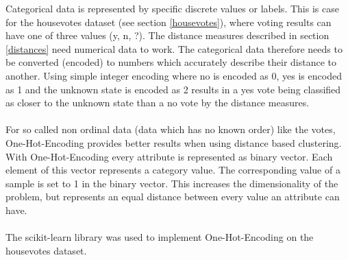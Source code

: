 Categorical data is represented by specific discrete values or labels. This is case for the housevotes dataset (see section \ref{housevotes}), where 
voting results can have one of three values (y, n, ?).
The distance measures described in section \ref{distances} need numerical data to work. The categorical data therefore needs to be converted (encoded) to numbers which accurately describe their distance to another.
Using simple integer encoding where no is encoded as 0, yes is encoded as 1 and the unknown state is encoded as 2 results in a yes vote being classified as closer to the unknown state than a no vote by the distance measures.\\
\ \\
For so called non ordinal data (data which has no known order) like the votes, One-Hot-Encoding provides better results when using distance based clustering.\\
With One-Hot-Encoding every attribute is represented as binary vector. Each element of this vector represents a category value. The corresponding value of a sample is set to 1 in the binary vector. 
This increases the dimensionality of the problem, but represents an equal distance between every value an attribute can have.\\
\ \\
The scikit-learn library \cite{scikitlearn} was used to implement One-Hot-Encoding on the housevotes dataset.
